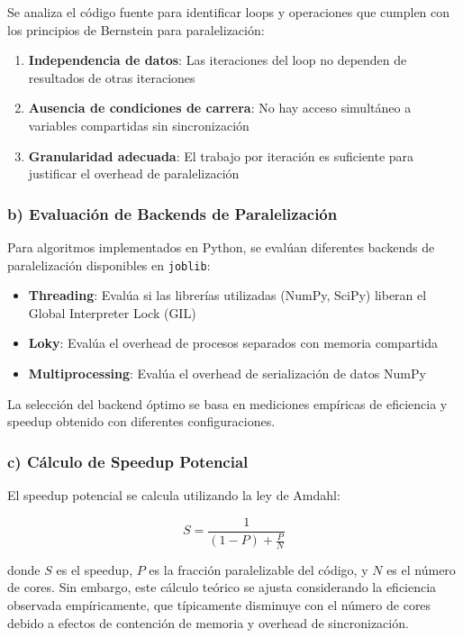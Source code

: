 Se analiza el código fuente para identificar loops y operaciones que cumplen con los principios de Bernstein para paralelización:

\begin{enumerate}
    \item \textbf{Independencia de datos}: Las iteraciones del loop no dependen de resultados de otras iteraciones
    \item \textbf{Ausencia de condiciones de carrera}: No hay acceso simultáneo a variables compartidas sin sincronización
    \item \textbf{Granularidad adecuada}: El trabajo por iteración es suficiente para justificar el overhead de paralelización
\end{enumerate}

\subsubsection{b) Evaluación de Backends de Paralelización}

Para algoritmos implementados en Python, se evalúan diferentes backends de paralelización disponibles en \texttt{joblib}:

\begin{itemize}
    \item \textbf{Threading}: Evalúa si las librerías utilizadas (NumPy, SciPy) liberan el Global Interpreter Lock (GIL)
    \item \textbf{Loky}: Evalúa el overhead de procesos separados con memoria compartida
    \item \textbf{Multiprocessing}: Evalúa el overhead de serialización de datos NumPy
\end{itemize}

La selección del backend óptimo se basa en mediciones empíricas de eficiencia y speedup obtenido con diferentes configuraciones.

\subsubsection{c) Cálculo de Speedup Potencial}

El speedup potencial se calcula utilizando la ley de Amdahl:

\begin{equation}
    S = \frac{1}{(1 - P) + \frac{P}{N}}
\end{equation}

donde $S$ es el speedup, $P$ es la fracción paralelizable del código, y $N$ es el número de cores. Sin embargo, este cálculo teórico se ajusta considerando la eficiencia observada empíricamente, que típicamente disminuye con el número de cores debido a efectos de contención de memoria y overhead de sincronización.


